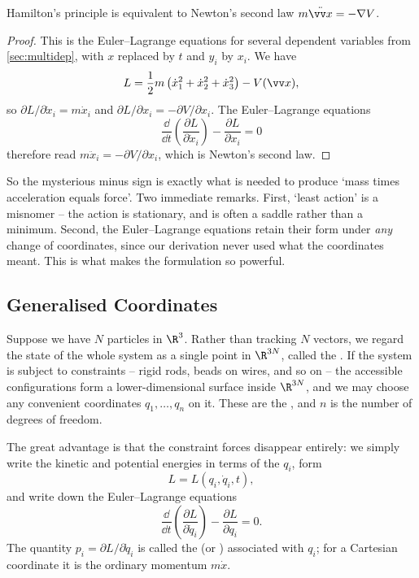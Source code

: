 \begin{theorem}
	Hamilton's principle is equivalent to Newton's second law $m\ddot{\vv x} = -\nabla V$.
\end{theorem}
\begin{proof}
	This is the Euler--Lagrange equations for several dependent variables from \autoref{sec:multidep}, with $x$ replaced by $t$ and $y_i$ by $x_i$. We have
	$$
	L = \frac{1}{2}m\left(\dot x_1^2 + \dot x_2^2 + \dot x_3^2\right) - V(\vv x),
	$$
	so $\partial L/\partial \dot x_i = m \dot x_i$ and $\partial L/\partial x_i = -\partial V/\partial x_i$. The Euler--Lagrange equations
	$$
	\frac{\dd}{\dd t}\left(\frac{\partial L}{\partial \dot x_i}\right) - \frac{\partial L}{\partial x_i} = 0
	$$
	therefore read $m\ddot x_i = -\partial V/\partial x_i$, which is Newton's second law.
\end{proof}

So the mysterious minus sign is exactly what is needed to produce `mass times acceleration equals force'. Two immediate remarks. First, `least action' is a misnomer -- the action is stationary, and is often a saddle rather than a minimum. Second, the Euler--Lagrange equations retain their form under \emph{any} change of coordinates, since our derivation never used what the coordinates meant. This is what makes the formulation so powerful.

\subsection{Generalised Coordinates}

Suppose we have $N$ particles in $\R^3$. Rather than tracking $N$ vectors, we regard the state of the whole system as a single point in $\R^{3N}$, called the . If the system is subject to constraints -- rigid rods, beads on wires, and so on -- the accessible configurations form a lower-dimensional surface inside $\R^{3N}$, and we may choose any convenient coordinates $q_1, \dots, q_n$ on it. These are the , and $n$ is the number of degrees of freedom.

The great advantage is that the constraint forces disappear entirely: we simply write the kinetic and potential energies in terms of the $q_i$, form
$$
L = L(q_i, \dot q_i, t),
$$
and write down the Euler--Lagrange equations
$$
\frac{\dd}{\dd t}\left(\frac{\partial L}{\partial \dot q_i}\right) - \frac{\partial L}{\partial q_i} = 0.
$$
The quantity $p_i = \partial L/\partial \dot q_i$ is called the  (or )  associated with $q_i$; for a Cartesian coordinate it is the ordinary momentum $m\dot x$.

